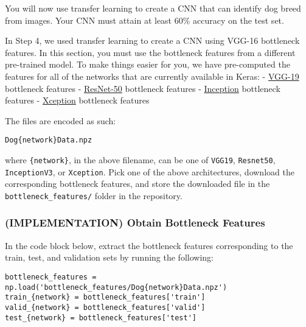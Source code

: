 \documentclass[11pt]{article}
\begin{document}
You will now use transfer learning to create a CNN that can identify dog
breed from images. Your CNN must attain at least 60\% accuracy on the
test set.

In Step 4, we used transfer learning to create a CNN using VGG-16
bottleneck features. In this section, you must use the bottleneck
features from a different pre-trained model. To make things easier for
you, we have pre-computed the features for all of the networks that are
currently available in Keras: -
\href{https://s3-us-west-1.amazonaws.com/udacity-aind/dog-project/DogVGG19Data.npz}{VGG-19}
bottleneck features -
\href{https://s3-us-west-1.amazonaws.com/udacity-aind/dog-project/DogResnet50Data.npz}{ResNet-50}
bottleneck features -
\href{https://s3-us-west-1.amazonaws.com/udacity-aind/dog-project/DogInceptionV3Data.npz}{Inception}
bottleneck features -
\href{https://s3-us-west-1.amazonaws.com/udacity-aind/dog-project/DogXceptionData.npz}{Xception}
bottleneck features

The files are encoded as such:

\begin{verbatim}
Dog{network}Data.npz
\end{verbatim}

where \texttt{\{network\}}, in the above filename, can be one of
\texttt{VGG19}, \texttt{Resnet50}, \texttt{InceptionV3}, or
\texttt{Xception}. Pick one of the above architectures, download the
corresponding bottleneck features, and store the downloaded file in the
\texttt{bottleneck\_features/} folder in the repository.

\subsubsection{(IMPLEMENTATION) Obtain Bottleneck
Features}\label{implementation-obtain-bottleneck-features}

In the code block below, extract the bottleneck features corresponding
to the train, test, and validation sets by running the following:

\begin{verbatim}
bottleneck_features = np.load('bottleneck_features/Dog{network}Data.npz')
train_{network} = bottleneck_features['train']
valid_{network} = bottleneck_features['valid']
test_{network} = bottleneck_features['test']
\end{verbatim}
\end{document}
